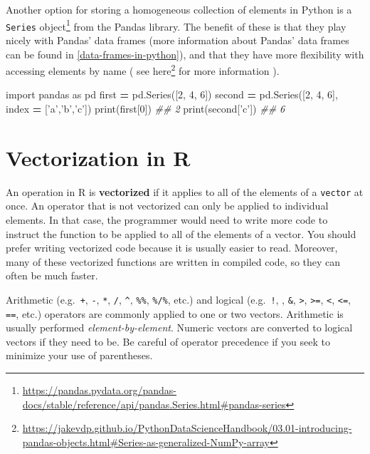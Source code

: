 \documentclass[12pt,krantz2]{krantz}
\makeatletter
\newenvironment{Shaded}{\begin{snugshade}}{\end{snugshade}}
\newcommand{\BuiltInTok}[1]{#1}
\newcommand{\CommentTok}[1]{\textcolor[rgb]{0.37,0.37,0.37}{\textit{#1}}}
\newcommand{\DecValTok}[1]{\textcolor[rgb]{0.06,0.06,0.06}{#1}}
\newcommand{\ImportTok}[1]{#1}
\newcommand{\NormalTok}[1]{#1}
\newcommand{\OperatorTok}[1]{\textcolor[rgb]{0.43,0.43,0.43}{\textbf{#1}}}
\newcommand{\StringTok}[1]{\textcolor[rgb]{0.5,0.5,0.5}{#1}}
\renewcommand{\href}[2]{#2\footnote{\url{#1}}}
\newenvironment{kframe}{%
\medskip{}
\setlength{\fboxsep}{.8em}
 \def\at@end@of@kframe{}%
 \ifinner\ifhmode%
  \def\at@end@of@kframe{\end{minipage}}%
  \begin{minipage}{\columnwidth}%
 \fi\fi%
 \def\FrameCommand##1{\hskip\@totalleftmargin \hskip-\fboxsep
 \colorbox{shadecolor}{##1}\hskip-\fboxsep
     \hskip-\linewidth \hskip-\@totalleftmargin \hskip\columnwidth}%
 \MakeFramed {\advance\hsize-\width
   \@totalleftmargin\z@ \linewidth\hsize
   \@setminipage}}%
 {\par\unskip\endMakeFramed%
 \at@end@of@kframe}
\renewenvironment{Shaded}{\begin{kframe}}{\end{kframe}}
\makeatother
\begin{document}
Another option for storing a homogeneous collection of elements in Python is a \href{https://pandas.pydata.org/pandas-docs/stable/reference/api/pandas.Series.html\#pandas-series}{\texttt{Series} object} from the Pandas library. The benefit of these is that they play nicely with Pandas' data frames (more information about Pandas' data frames can be found in \ref{data-frames-in-python}), and that they have more flexibility with accessing elements by name ( see \href{https://jakevdp.github.io/PythonDataScienceHandbook/03.01-introducing-pandas-objects.html\#Series-as-generalized-NumPy-array}{here} for more information ).

\begin{Shaded}
\begin{Highlighting}[]
\ImportTok{import}\NormalTok{ pandas }\ImportTok{as}\NormalTok{ pd}
\NormalTok{first }\OperatorTok{=}\NormalTok{ pd.Series([}\DecValTok{2}\NormalTok{, }\DecValTok{4}\NormalTok{, }\DecValTok{6}\NormalTok{])}
\NormalTok{second }\OperatorTok{=}\NormalTok{ pd.Series([}\DecValTok{2}\NormalTok{, }\DecValTok{4}\NormalTok{, }\DecValTok{6}\NormalTok{], index }\OperatorTok{=}\NormalTok{ [}\StringTok{'a'}\NormalTok{,}\StringTok{'b'}\NormalTok{,}\StringTok{'c'}\NormalTok{])}
\BuiltInTok{print}\NormalTok{(first[}\DecValTok{0}\NormalTok{])}
\CommentTok{## 2}
\BuiltInTok{print}\NormalTok{(second[}\StringTok{'c'}\NormalTok{])}
\CommentTok{## 6}
\end{Highlighting}
\end{Shaded}

\hypertarget{vectorization-in-r}{%
\section{Vectorization in R}\label{vectorization-in-r}}

An operation in R is \textbf{vectorized} if it applies to all of the elements of a \texttt{vector} at once. An operator that is not vectorized can only be applied to individual elements. In that case, the programmer would need to write more code to instruct the function to be applied to all of the elements of a vector. You should prefer writing vectorized code because it is usually easier to read. Moreover, many of these vectorized functions are written in compiled code, so they can often be much faster.

Arithmetic (e.g.~\texttt{+}, \texttt{-}, \texttt{*}, \texttt{/}, \texttt{\^{}}, \texttt{\%\%}, \texttt{\%/\%}, etc.) and logical (e.g.~\texttt{!}, \texttt{\textbar{}}, \texttt{\&}, \texttt{\textgreater{}}, \texttt{\textgreater{}=}, \texttt{\textless{}}, \texttt{\textless{}=}, \texttt{==}, etc.) operators are commonly applied to one or two vectors. Arithmetic is usually performed \emph{element-by-element}. Numeric vectors are converted to logical vectors if they need to be. Be careful of operator precedence if you seek to minimize your use of parentheses.
\end{document}
